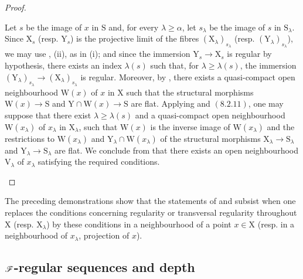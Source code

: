 \begin{proof}
\begin{enumerate}
Let $s$ be the image of $x$ in $\mathrm{S}$ and, for every $\lambda\geqslant\alpha$, let $s_\lambda$ be the image of $s$ in $\mathrm{S}_\lambda$. Since $\mathrm{X}_s$ (resp. $\mathrm{Y}_s$) is the projective limit of the fibres $(\mathrm{X}_\lambda)_{s_\lambda}$ (resp. $(\mathrm{Y}_\lambda)_{s_\lambda}$), we may use , (ii), as in (i); and since the immersion $\mathrm{Y}_s\to\mathrm{X}_s$ is regular by hypothesis, there exists an index $\lambda(s)$ such that, for $\lambda\geqslant\lambda(s)$, the immersion $(\mathrm{Y}_\lambda)_{s_\lambda}\to(\mathrm{X}_\lambda)_{s_\lambda}$ is regular. Moreover, by , there exists a quasi-compact open neighbourhood $\mathrm{W}(x)$ of $x$ in $\mathrm{X}$ such that the structural morphisms $\mathrm{W}(x)\to\mathrm{S}$ and $\mathrm{Y}\cap\mathrm{W}(x)\to\mathrm{S}$ are flat. Applying  and $(8.2.11)$, one may suppose that there exist $\lambda\geqslant\lambda(s)$ and a quasi-compact open neighbourhood $\mathrm{W}(x_\lambda)$ of $x_\lambda$ in $\mathrm{X}_\lambda$, such that $\mathrm{W}(x)$ is the inverse image of $\mathrm{W}(x_\lambda)$ and the restrictions to $\mathrm{W}(x_\lambda)$ and $\mathrm{Y}_\lambda\cap\mathrm{W}(x_\lambda)$ of the structural morphisms $\mathrm{X}_\lambda\to\mathrm{S}_\lambda$ and $\mathrm{Y}_\lambda\to\mathrm{S}_\lambda$ are flat. We conclude from  that there exists an open neighbourhood $\mathrm{V}_\lambda$ of $x_\lambda$ satisfying the required conditions.
\end{enumerate}
\end{proof}

\begin{remark}[19.8.3]
\label{IV.19.8.3}
The preceding demonstrations show that the statements of  and  subsist when one replaces the conditions concerning regularity or transversal regularity throughout $\mathrm{X}$ (resp. $\mathrm{X}_\lambda$) by these conditions in a neighbourhood of a point $x\in\mathrm{X}$ (resp. in a neighbourhood of $x_\lambda$, projection of $x$).
\end{remark}

\subsection{\texorpdfstring{$\mathscr{F}$}{F}-regular sequences and depth}
\label{subsection:IV.19.9}
\label{IV.19.9}


